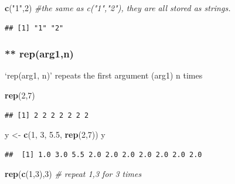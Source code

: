 \documentclass[]{article}
\newenvironment{Shaded}{\begin{snugshade}}{\end{snugshade}}
\newcommand{\CommentTok}[1]{\textcolor[rgb]{0.56,0.35,0.01}{\textit{#1}}}
\newcommand{\DecValTok}[1]{\textcolor[rgb]{0.00,0.00,0.81}{#1}}
\newcommand{\FloatTok}[1]{\textcolor[rgb]{0.00,0.00,0.81}{#1}}
\newcommand{\KeywordTok}[1]{\textcolor[rgb]{0.13,0.29,0.53}{\textbf{#1}}}
\newcommand{\NormalTok}[1]{#1}
\newcommand{\StringTok}[1]{\textcolor[rgb]{0.31,0.60,0.02}{#1}}
\begin{document}
\begin{Shaded}
\begin{Highlighting}[]
\KeywordTok{c}\NormalTok{(}\StringTok{"1"}\NormalTok{,}\DecValTok{2}\NormalTok{) }\CommentTok{#the same as c("1","2"), they are all stored as strings. }
\end{Highlighting}
\end{Shaded}

\begin{verbatim}
## [1] "1" "2"
\end{verbatim}

\hypertarget{reparg1n}{%
\subsubsection{** rep(arg1,n)}\label{reparg1n}}

`rep(arg1, n)' repeats the first argument (arg1) n times

\begin{Shaded}
\begin{Highlighting}[]
\KeywordTok{rep}\NormalTok{(}\DecValTok{2}\NormalTok{,}\DecValTok{7}\NormalTok{)}
\end{Highlighting}
\end{Shaded}

\begin{verbatim}
## [1] 2 2 2 2 2 2 2
\end{verbatim}

\begin{Shaded}
\begin{Highlighting}[]
\NormalTok{y <-}\StringTok{ }\KeywordTok{c}\NormalTok{(}\DecValTok{1}\NormalTok{, }\DecValTok{3}\NormalTok{, }\FloatTok{5.5}\NormalTok{, }\KeywordTok{rep}\NormalTok{(}\DecValTok{2}\NormalTok{,}\DecValTok{7}\NormalTok{))}
\NormalTok{y}
\end{Highlighting}
\end{Shaded}

\begin{verbatim}
##  [1] 1.0 3.0 5.5 2.0 2.0 2.0 2.0 2.0 2.0 2.0
\end{verbatim}

\begin{Shaded}
\begin{Highlighting}[]
\KeywordTok{rep}\NormalTok{(}\KeywordTok{c}\NormalTok{(}\DecValTok{1}\NormalTok{,}\DecValTok{3}\NormalTok{),}\DecValTok{3}\NormalTok{) }\CommentTok{# repeat 1,3 for 3 times}
\end{Highlighting}
\end{Shaded}
\end{document}
